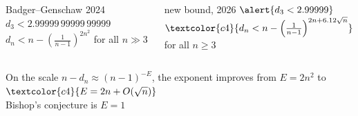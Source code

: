 \begin{columns}[1 1]
\begin{theorem}{Badger–Genschaw 2024}
$d_3<2.99999\,99999\,99999$
\medskip
$d_n<n-\left(\frac{1}{n-1}\right)^{2n^2}$ for all $n\gg3$
\end{theorem}
\columnbreak
\begin{theorem}{new bound, 2026}
$\alert{d_3<2.99999}$
\medskip
$\textcolor{c4}{d_n<n-\left(\frac{1}{n-1}\right)^{2n+6.12\sqrt n}}$ for all $n\geq3$
\end{theorem}
\end{columns}
\begin{center}
On the scale $n-d_n\approx(n-1)^{-E}$, the exponent improves from $E=2n^2$ to $\textcolor{c4}{E=2n+O(\sqrt n)}$\\ Bishop's conjecture is $E=1$ 
\end{center}

